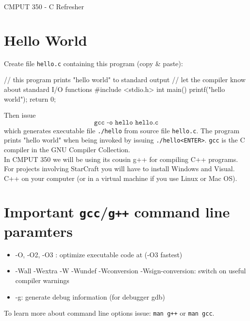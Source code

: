 \documentclass[a4paper,11pt]{article}
\begin{document}

\begin{center}
{\Large CMPUT 350 - C Refresher}
\end{center}


\section{Hello World}
Create file \texttt{hello.c} containing this program (copy \& paste):
\begin{cppcode}
// this program prints "hello world" to standard output
// let the compiler know about standard I/O functions
#include <stdio.h>
int main() {
    printf("hello world\n");
    return 0;
}
\end{cppcode}
Then issue 
\[ \texttt{gcc -o hello hello.c} \]
which generates executable file \texttt{./hello} from source file \texttt{hello.c}.
The program prints "hello world" when being invoked by issuing \texttt{./hello<ENTER>}.
\texttt{gcc} is the C compiler in the GNU Compiler Collection. \\

In CMPUT 350 we will be using its cousin g++ for compiling C++ programs.
For projects involving StarCraft you will have to install Windows and Visual.
C++ on your computer (or in a virtual machine if you use Linux or Mac OS).


\section{Important \texttt{gcc}/\texttt{g++} command line paramters}
\begin{itemize}
    \item -O, -O2, -O3 : optimize executable code at (-O3 fastest)
    \item -Wall -Wextra -W -Wundef -Wconversion -Wsign-conversion: switch on useful compiler warnings
    \item -g: generate debug information (for debugger gdb)
\end{itemize}

To learn more about command line options issue: \texttt{man g++} or \texttt{man gcc}.

\end{document}
